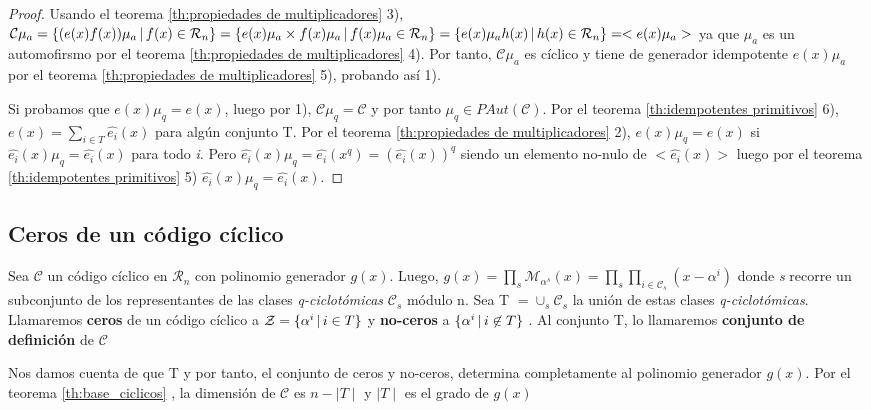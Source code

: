 \begin{proof}
Usando el teorema \ref{th:propiedades de multiplicadores} 3), $\mathcal{C}\mu_a = \{ (e(x)f(x))\mu_a \thinspace | \thinspace f(x) \in \mathcal{R}_n \} = \{ e(x)\mu_a \times f(x)\mu_a \thinspace | \thinspace f(x)\mu_a \in \mathcal{R}_n \} = \{ e(x)\mu_ah(x) \thinspace | \thinspace h(x) \in \mathcal{R}_n \} = <e(x)\mu_a> $ ya que $\mu_a$ es un automofirsmo por el teorema \ref{th:propiedades de multiplicadores} 4). Por tanto, $\mathcal{C}\mu_a$ es cíclico y tiene de generador idempotente $e(x)\mu_a$ por el teorema \ref{th:propiedades de multiplicadores} 5), probando así 1).

Si probamos que $e(x)\mu_q = e(x)$, luego por 1), $\mathcal{C}\mu_q = \mathcal{C}$ y por tanto $\mu_q \in PAut(\mathcal{C})$. Por el teorema \ref{th:idempotentes primitivos} 6), $e(x) = \sum_{i \in T} \widehat{e_i}(x) $ para algún conjunto T. Por el teorema \ref{th:propiedades de multiplicadores} 2), $e(x)\mu_q = e(x)$ si $\widehat{e_i}(x)\mu_q = \widehat{e_i}(x)$ para todo \textit{i}. Pero $\widehat{e_i}(x)\mu_q = \widehat{e_i}(x^q) = (\widehat{e_i}(x))^q$ siendo un elemento no-nulo de $<\widehat{e_i}(x)>$ luego por el teorema \ref{th:idempotentes primitivos} 5) $\widehat{e_i}(x)\mu_q  = \widehat{e_i}(x)$.
\end{proof}

\subsection{Ceros de un código cíclico}

\begin{definition}
Sea $\mathcal{C}$ un código cíclico en $\mathcal{R}_n$ con polinomio generador $g(x)$. Luego, $g(x) = \prod_{s} \mathcal{M}_{\alpha^s}(x) = \prod_{s} \prod_{i \in \mathcal{C}_s} (x-\alpha^i) $ donde \textit{s} recorre un subconjunto de los representantes de las clases \textit{q-ciclotómicas} $\mathcal{C}_s$ módulo n. Sea T $ = \cup_s \mathcal{C}_s$ la unión de estas clases \textit{q-ciclotómicas}. Llamaremos \textbf{ceros} de un código cíclico a $\mathcal{Z} = \{ \alpha^i \thinspace | \thinspace i \in T \}$ y \textbf{no-ceros} a $\{ \alpha^i \thinspace | \thinspace i \not\in T \}$ . Al conjunto T, lo llamaremos \textbf{conjunto de definición} de $\mathcal{C}$
\end{definition}

Nos damos cuenta de que T y por tanto, el conjunto de ceros y no-ceros, determina completamente al polinomio generador $g(x)$. Por el teorema \ref{th:base_ciclicos} , la dimensión de $\mathcal{C}$ es $ n - \mid T \mid$ y $\mid T \mid$ es el grado de $g(x)$



